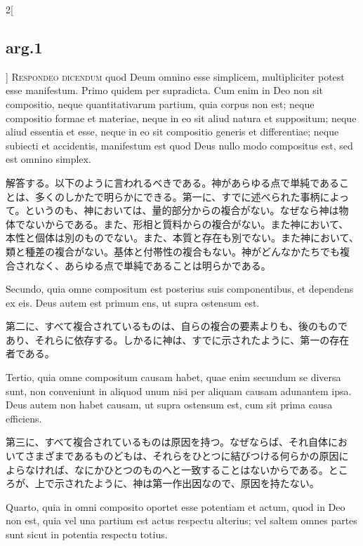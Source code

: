 \documentclass[paper=a4paper,fontsize=10pt,jafontsize=9pt,titlepage]{jlreq}
\begin{document}
\begin{paracol}{2}[\subsection{arg.1}]
{\scshape Respondeo dicendum} quod Deum omnino esse simplicem,
 multipliciter potest esse manifestum. Primo quidem per
 supradicta. Cum enim in Deo non sit compositio, neque quantitativarum
 partium, quia corpus non est; neque compositio formae et materiae,
 neque in eo sit aliud natura et suppositum; neque aliud essentia et
 esse, neque in eo sit compositio generis et differentiae; neque
 subiecti et accidentis, manifestum est quod Deus nullo modo
 compositus est, sed est omnino simplex.

\switchcolumn

解答する。以下のように言われるべきである。神があらゆる点で単純であるこ
とは、多くのしかたで明らかにできる。第一に、すでに述べられた事柄によっ
て。というのも、神においては、量的部分からの複合がない。なぜなら神は物
体でないからである。また、形相と質料からの複合がない。また神において、
本性と個体は別のものでない。また、本質と存在も別でない。また神において、
類と種差の複合がない。基体と付帯性の複合もない。神がどんなかたちでも複
合されなく、あらゆる点で単純であることは明らかである。

\switchcolumn*

Secundo, quia omne compositum est posterius suis componentibus, et
dependens ex eis. Deus autem est primum ens, ut supra ostensum est.

\switchcolumn

第二に、すべて複合されているものは、自らの複合の要素よりも、後のもので
あり、それらに依存する。しかるに神は、すでに示されたように、第一の存在
者である。

\switchcolumn*

Tertio, quia omne compositum causam habet, quae enim secundum se
diversa sunt, non conveniunt in aliquod unum nisi per aliquam causam
adunantem ipsa. Deus autem non habet causam, ut supra ostensum est,
cum sit prima causa efficiens.

\switchcolumn

第三に、すべて複合されているものは原因を持つ。なぜならば、それ自体にお
いてさまざまであるものどもは、それらをひとつに結びつける何らかの原因に
よらなければ、なにかひとつのものへと一致することはないからである。とこ
ろが、上で示されたように、神は第一作出因なので、原因を持たない。

\switchcolumn*

Quarto, quia in omni composito oportet esse potentiam et actum, quod
in Deo non est, quia vel una partium est actus respectu alterius; vel
saltem omnes partes sunt sicut in potentia respectu totius.

\switchcolumn


\end{paracol}
\end{document}
